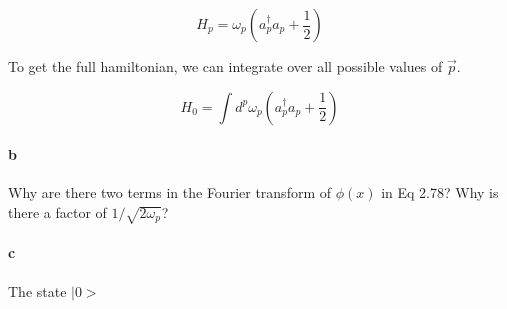 \documentclass{article}
\begin{document}
\[ H_p = \omega_p \left( a_p^\dagger a_p + \frac{1}{2} \right) \]

To get the full hamiltonian, we can integrate over all possible values of $\vec{p}$.

\[ H_0 = \int d^p \omega_p \left( a_p^\dagger a_p + \frac{1}{2} \right) \]


\paragraph{b}
Why are there two terms in the Fourier transform of $\phi(x)$ in Eq 2.78?
Why is there a factor of $1/\sqrt{2 \omega_p}$?

\paragraph{c}
The state $|0>$
\end{document}
